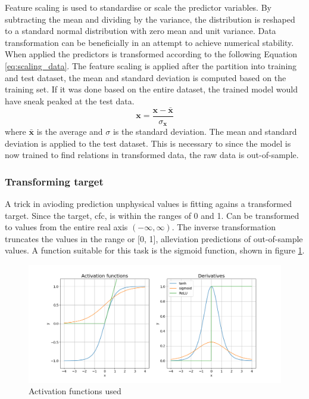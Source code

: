 Feature scaling is used to standardise or scale the predictor variables. By subtracting the mean and dividing by the variance, the distribution is reshaped to a standard normal distribution with zero mean and unit variance. Data transformation can be beneficially in an attempt to achieve numerical stability. When applied the predictors is transformed according to the following Equation \ref{eq:scaling_data}. The feature scaling is applied after the partition into training and test dataset, the mean and standard deviation is computed based on the training set. If it was done based on the entire dataset, the trained model would have sneak peaked at the test data.
\begin{equation} \label{eq:scaling_data}
    \mathbf{x} = \frac{\mathbf{x} - \bar{\mathbf{x}}}{\sigma_{\mathbf{x}}}
\end{equation}
where $\bar{\mathbf{x}}$ is the average and $\sigma$ is the standard deviation.
The mean and standard deviation is applied to the test dataset. This is necessary to since the model is now trained to find relations in transformed data, the raw data is out-of-sample.

\subsubsection{Transforming target} \label{sec:transforming_target}
A trick in avioding prediction unphysical values is fitting agains a transformed target. Since the target, \acrfull{cfc}, is within the ranges of 0 and 1. Can be transformed to values from the entire real axis $(-\infty, \infty)$. The inverse transformation truncates the values in the range or [0, 1], alleviation predictions of out-of-sample values. A function suitable for this task is the sigmoid function, shown in figure \ref{fig:activation_func_plus}. 
\begin{figure}
    \centering
    \includegraphics[scale=0.45]{Chapter3_Method/figs/activation_functions_and_derivatives.png}
    \caption{Activation functions used }
    \label{fig:activation_func_plus}
\end{figure}

